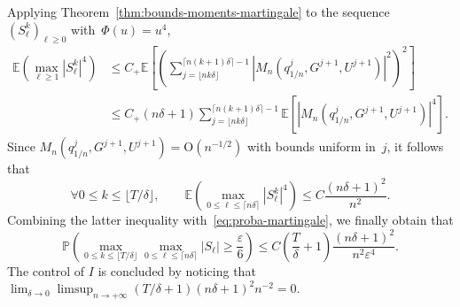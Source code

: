 \documentclass{article}
\newcommand{\dps}{\displaystyle }
\renewcommand{\leq}{\leqslant}
\renewcommand{\geq}{\geqslant}
\def\E{\mathbb{E}} %
\def\P{\mathbb{P}} %
\begin{document}
Applying Theorem~\ref{thm:bounds-moments-martingale} to the sequence~$(S^k_\ell)_{\ell \geq 0}$ with~$\Phi(u) = u^4$,
\begin{equation}
  \label{eq:moment-4}
  \begin{aligned}
    \E\left(\max_{\ell\geq 1}|S^k_\ell|^4 \right) & \leq C_+ \E\left[ \left(\sum_{j=\lfloor nk\delta \rfloor}^{\lceil n(k+1)\delta \rceil-1}\left|M_n\left(q_{1/n}^{j}, G^{j+1},U^{j+1}\right)\right|^2\right)^2\right] \\
    & \leq C_+(n\delta+1) \sum_{j=\lfloor nk\delta \rfloor}^{\lceil n(k+1)\delta \rceil-1} \E\left[\left|M_n\left(q_{1/n}^j, G^{j+1},U^{j+1}\right)\right|^4\right].
  \end{aligned}
\end{equation}
Since $M_n\left(q_{1/n}^{j}, G^{j+1},U^{j+1}\right) = \mathrm{O}(n^{-1/2})$ with bounds uniform in~$j$, it follows that
\begin{equation}
  \label{eq:moment-4-bis}
  \forall 0\leq k \leq \lfloor T/\delta \rfloor,
  \qquad
  \E\left(\max_{0 \leq \ell\leq \lceil n\delta \rceil}|S^k_\ell|^4 \right)\leq C \frac{(n\delta + 1)^2}{n^2}.
\end{equation}
Combining the latter inequality with~\eqref{eq:proba-martingale}, we finally obtain that
\[
\P\left(\max_{0\leq k \leq \lfloor T/\delta \rfloor}\max_{0 \leq \ell\leq \lceil n\delta \rceil}\left |S_\ell\right|  \geq \frac{\varepsilon}{6}\right) \leq C \left(\frac{T}{\delta}+1\right)\frac{(n\delta + 1)^2}{n^2 \varepsilon^4}.
\]
The control of $I$ is concluded by noticing that~$\dps \lim_{\delta\to 0}\limsup_{n\to+\infty} \left(T/\delta+1\right)(n\delta + 1)^2 n^{-2} = 0$.
\end{document}

